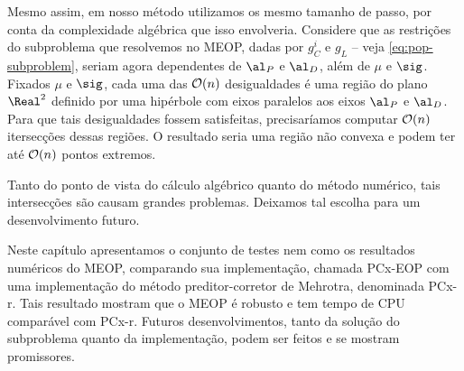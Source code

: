 Mesmo assim, em nosso método utilizamos os mesmo tamanho de passo, por conta da complexidade algébrica que isso envolveria. Considere que as restrições do subproblema que resolvemos no MEOP, dadas por $g^{i}_{C}$ e $g_{L}$ -- veja \eqref{eq:pop-subproblem}, seriam agora dependentes de $\al_{P}$ e $\al_{D}$, além de $\mu$ e $\sig$. Fixados $\mu$ e $\sig$, cada uma das $\mathcal{O}(n)$ desigualdades é uma região do plano $\Real^{2}$ definido por uma hipérbole com eixos paralelos aos eixos $\al_{P}$ e $\al_{D}$.  Para que tais desigualdades fossem satisfeitas, precisaríamos computar $\mathcal{O}(n)$ itersecções dessas regiões. O resultado seria uma região não convexa e podem ter até $\mathcal{O}(n)$ pontos extremos. 

Tanto do ponto de vista do cálculo algébrico quanto do método numérico, tais intersecções são causam grandes problemas. Deixamos tal escolha para um desenvolvimento futuro.


Neste capítulo apresentamos o conjunto de testes  nem como os resultados numéricos do MEOP, comparando sua implementação, chamada PCx-EOP com uma implementação do método preditor-corretor de Mehrotra, denominada PCx-r. Tais resultado mostram que o MEOP é robusto e tem tempo de CPU comparável com PCx-r. Futuros desenvolvimentos, tanto da solução do subproblema quanto da implementação, podem ser feitos e se mostram promissores. 